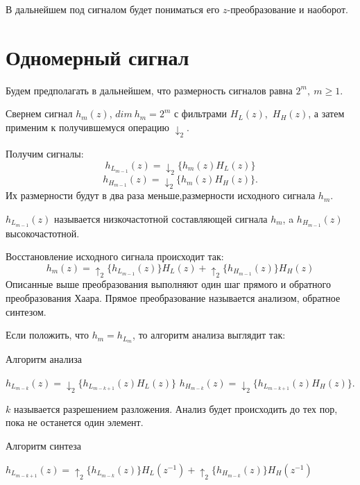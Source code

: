 \documentclass[oneside, final, 14pt]{extreport}
\begin{document}
В дальнейшем под сигналом будет пониматься его $z$-преобразование и наоборот.
\section{Одномерный сигнал}
Будем предполагать в дальнейшем, что размерность сигналов равна $2^m,~m \geq 1$.

Свернем сигнал $h_m(z)$, $dim~h_m = 2^m$ с фильтрами $H_L(z)$,~$H_H(z)$, а затем применим к получившемуся операцию $\downarrow_2$.

Получим сигналы: $$h_{L_{m-1}}(z) = \downarrow_2 \{h_m(z)H_L(z)\}$$ $$h_{H_{m-1}}(z) = \downarrow_2 \{h_m(z)H_H(z)\}.$$ Их размерности будут в два раза меньше,размерности исходного сигнала $h_m$.

$h_{L_{m-1}}(z)$ называется низкочастотной составляющей сигнала $h_m$, a $h_{H_{m-1}}(z)$ высокочастотной. 

Восстановление исходного сигнала происходит так:
$$h_m(z) = \uparrow_2 \{ h_{L_{m-1}}(z) \} H_L(z) + \uparrow_2 \{ h_{H_{m-1}}(z) \} H_H(z)	$$
Описанные выше преобразования выполняют один шаг прямого и обратного преобразования Хаара. Прямое преобразование называется анализом, обратное синтезом.

Если положить, что $h_m = h_{L_m}$, то алгоритм анализа выглядит так:
\begin{algorithm}
\caption{Алгоритм анализа}
\begin{algorithmic}
	\State $h_{L_{m-k}}(z) = \downarrow_2 \{h_{L_{m-k+1}}(z)H_L(z)\}$
	\State $h_{H_{m-k}}(z) = \downarrow_2 \{h_{L_{m-k+1}}(z)H_H(z)\}.$
	\EndFor
\end{algorithmic}
\end{algorithm}


$k$ называется разрешением разложения. Анализ будет происходить до тех пор, пока не останется один элемент.
\begin{algorithm}[H]
\caption{Алгоритм синтеза}
\begin{algorithmic}
		\State$h_{L_{m-k + 1}}(z) = \uparrow_2 \{ h_{L_{m-k}}(z) \} H_L(z^{-1}) + \uparrow_2 \{ h_{H_{m-k}}(z) \} H_H(z^{-1})$
	\EndFor
\end{algorithmic}
\end{algorithm}	
\end{document}
